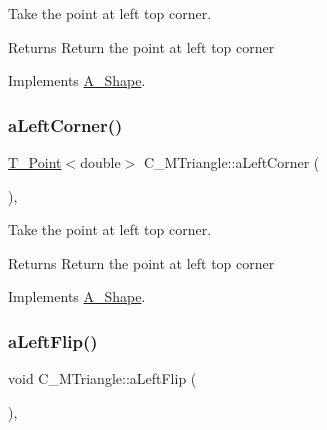 Take the point at left top corner. 

\begin{DoxyReturn}{Returns}
Return the point at left top corner 
\end{DoxyReturn}


Implements \hyperlink{classA__Shape_abe6781b13037bf7ecea8ff9456b31533}{A\+\_\+\+Shape}.

\mbox{\label{classC__MTriangle_acebfe2f7c6792b2bfe323c4ad82970be}} 
\subsubsection{\texorpdfstring{a\+Left\+Corner()}{aLeftCorner()}\hspace{0.1cm}{\footnotesize\ttfamily [2/2]}}
{\footnotesize\ttfamily \hyperlink{classT__Point}{T\+\_\+\+Point}$<$double$>$ C\+\_\+\+M\+Triangle\+::a\+Left\+Corner (\begin{DoxyParamCaption}{ }\end{DoxyParamCaption})\hspace{0.3cm}{\ttfamily [override]}, {\ttfamily [virtual]}}



Take the point at left top corner. 

\begin{DoxyReturn}{Returns}
Return the point at left top corner 
\end{DoxyReturn}


Implements \hyperlink{classA__Shape_abe6781b13037bf7ecea8ff9456b31533}{A\+\_\+\+Shape}.

\mbox{\label{classC__MTriangle_a3dcac8e1341a79139577deb851a6481e}} 
\subsubsection{\texorpdfstring{a\+Left\+Flip()}{aLeftFlip()}\hspace{0.1cm}{\footnotesize\ttfamily [1/2]}}
{\footnotesize\ttfamily void C\+\_\+\+M\+Triangle\+::a\+Left\+Flip (\begin{DoxyParamCaption}{ }\end{DoxyParamCaption})\hspace{0.3cm}{\ttfamily [override]}, {\ttfamily [virtual]}}



